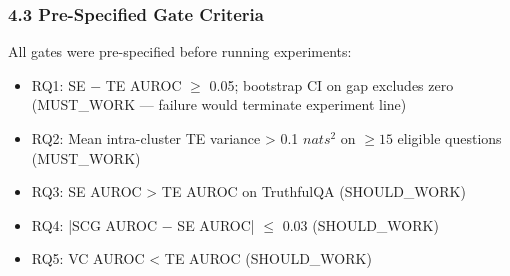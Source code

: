 \subsubsection{4.3 Pre-Specified Gate Criteria}

All gates were pre-specified before running experiments:

\begin{itemize}
\item RQ1: SE $-$ TE AUROC $\geq$ 0.05; bootstrap CI on gap excludes zero (MUST\_WORK --- failure would terminate experiment line)
\item RQ2: Mean intra-cluster TE variance > 0.1 $nats^2$ on $\geq 15$ eligible questions (MUST\_WORK)
\item RQ3: SE AUROC > TE AUROC on TruthfulQA (SHOULD\_WORK)
\item RQ4: |SCG AUROC $-$ SE AUROC| $\leq$ 0.03 (SHOULD\_WORK)
\item RQ5: VC AUROC < TE AUROC (SHOULD\_WORK)
\end{itemize}

